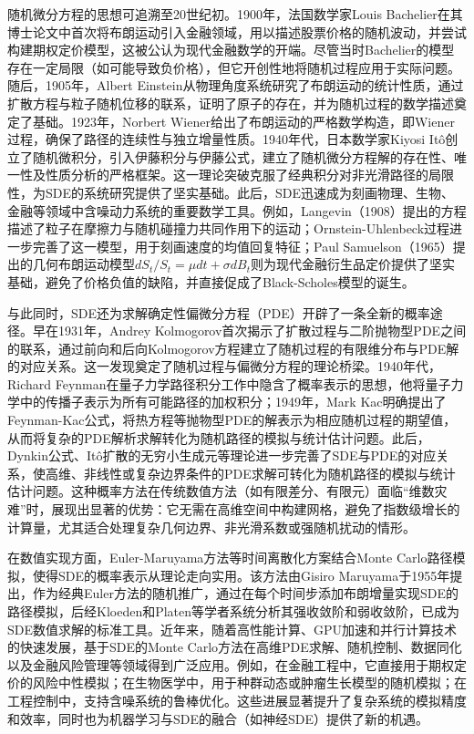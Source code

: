 \documentclass[UTF8，12pt]{ctexart}
\numberwithin{equation}{section}
\begin{document}
随机微分方程的思想可追溯至20世纪初。1900年，法国数学家Louis Bachelier在其博士论文中首次将布朗运动引入金融领域，用以描述股票价格的随机波动，并尝试构建期权定价模型，这被公认为现代金融数学的开端。尽管当时Bachelier的模型存在一定局限（如可能导致负价格），但它开创性地将随机过程应用于实际问题。随后，1905年，Albert Einstein从物理角度系统研究了布朗运动的统计性质，通过扩散方程与粒子随机位移的联系，证明了原子的存在，并为随机过程的数学描述奠定了基础。1923年，Norbert Wiener给出了布朗运动的严格数学构造，即Wiener过程，确保了路径的连续性与独立增量性质。1940年代，日本数学家Kiyosi Itô创立了随机微积分，引入伊藤积分与伊藤公式，建立了随机微分方程解的存在性、唯一性及性质分析的严格框架。这一理论突破克服了经典积分对非光滑路径的局限性，为SDE的系统研究提供了坚实基础。此后，SDE迅速成为刻画物理、生物、金融等领域中含噪动力系统的重要数学工具。例如，Langevin（1908）提出的方程描述了粒子在摩擦力与随机碰撞力共同作用下的运动；Ornstein-Uhlenbeck过程进一步完善了这一模型，用于刻画速度的均值回复特征；Paul Samuelson（1965）提出的几何布朗运动模型$dS_t / S_t = μ dt + σ dB_t$则为现代金融衍生品定价提供了坚实基础，避免了价格负值的缺陷，并直接促成了Black-Scholes模型的诞生。

与此同时，SDE还为求解确定性偏微分方程（PDE）开辟了一条全新的概率途径。早在1931年，Andrey Kolmogorov首次揭示了扩散过程与二阶抛物型PDE之间的联系，通过前向和后向Kolmogorov方程建立了随机过程的有限维分布与PDE解的对应关系。这一发现奠定了随机过程与偏微分方程的理论桥梁。1940年代，Richard Feynman在量子力学路径积分工作中隐含了概率表示的思想，他将量子力学中的传播子表示为所有可能路径的加权积分；1949年，Mark Kac明确提出了Feynman-Kac公式，将热方程等抛物型PDE的解表示为相应随机过程的期望值，从而将复杂的PDE解析求解转化为随机路径的模拟与统计估计问题。此后，Dynkin公式、Itô扩散的无穷小生成元等理论进一步完善了SDE与PDE的对应关系，使高维、非线性或复杂边界条件的PDE求解可转化为随机路径的模拟与统计估计问题。这种概率方法在传统数值方法（如有限差分、有限元）面临“维数灾难”时，展现出显著的优势：它无需在高维空间中构建网格，避免了指数级增长的计算量，尤其适合处理复杂几何边界、非光滑系数或强随机扰动的情形。

在数值实现方面，Euler-Maruyama方法等时间离散化方案结合Monte Carlo路径模拟，使得SDE的概率表示从理论走向实用。该方法由Gisiro Maruyama于1955年提出，作为经典Euler方法的随机推广，通过在每个时间步添加布朗增量实现SDE的路径模拟，后经Kloeden和Platen等学者系统分析其强收敛阶和弱收敛阶，已成为SDE数值求解的标准工具。近年来，随着高性能计算、GPU加速和并行计算技术的快速发展，基于SDE的Monte Carlo方法在高维PDE求解、随机控制、数据同化以及金融风险管理等领域得到广泛应用。例如，在金融工程中，它直接用于期权定价的风险中性模拟；在生物医学中，用于种群动态或肿瘤生长模型的随机模拟；在工程控制中，支持含噪系统的鲁棒优化。这些进展显著提升了复杂系统的模拟精度和效率，同时也为机器学习与SDE的融合（如神经SDE）提供了新的机遇。
\end{document}
